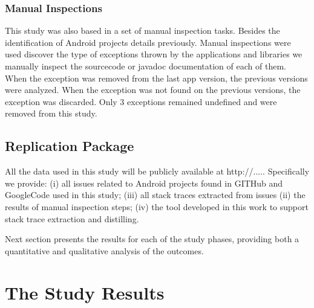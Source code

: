 \documentclass[conference]{IEEEtran}
\begin{document}
\subsubsection{Manual Inspections}
This study was also based in a set of manual inspection tasks. Besides the 
 identification of Android projects details previously. 
Manual inspections were used discover the type of exceptions thrown by 
the applications and libraries we manually inspect the sourcecode or javadoc
 documentation of each of them. When the exception was removed from the 
last app version, the previous versions were analyzed. When the exception was
 not found on the previous versions, the exception was discarded.  Only 3 exceptions 
remained undefined and were removed from this study.


\subsection{Replication Package}
All the data used in this study will be publicly available at http://.....
Specifically we provide: (i) all issues related to Android projects found
in GITHub and GoogleCode used in this study; (iii) all stack traces extracted
from issues (ii) the results of manual inspection steps; (iv) the tool developed 
in this work to support stack trace extraction and distilling.

Next section presents the results for each of the study phases, providing both a
quantitative and qualitative analysis of the outcomes.

\section{The Study Results}
\end{document}
